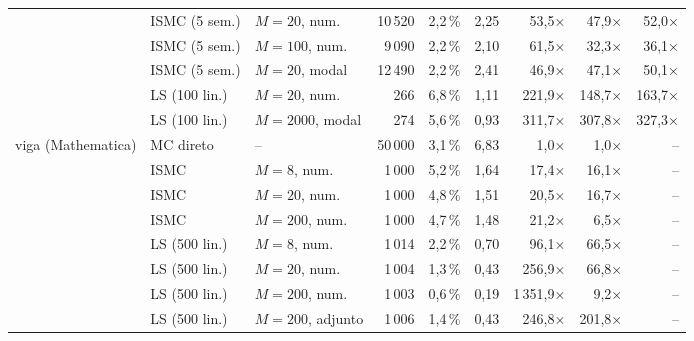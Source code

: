 \begin{landscape}
\begin{table}[H]
\begin{tabular}{lllrrrrrr}
 & ISMC (5 sem.) & $M = 20$, num. & 10\,520 & 2,2\,\% & 2,25 & 53,5× & 47,9× & 52,0× \\
 & ISMC (5 sem.) & $M = 100$, num. & 9\,090 & 2,2\,\% & 2,10 & 61,5× & 32,3× & 36,1× \\
 & ISMC (5 sem.) & $M = 20$, modal & 12\,490 & 2,2\,\% & 2,41 & 46,9× & 47,1× & 50,1× \\
 & LS (100 lin.) & $M = 20$, num. & 266 & 6,8\,\% & 1,11 & 221,9× & 148,7× & 163,7× \\
 & LS (100 lin.) & $M = 2000$, modal & 274 & 5,6\,\% & 0,93 & 311,7× & 307,8× & 327,3× \\
\midrule
viga (Mathematica) & MC direto & -- & 50\,000 & 3,1\,\% & 6,83 & 1,0× & 1,0× & -- \\
 & ISMC & $M = 8$, num. & 1\,000 & 5,2\,\% & 1,64 & 17,4× & 16,1× & -- \\
 & ISMC & $M = 20$, num. & 1\,000 & 4,8\,\% & 1,51 & 20,5× & 16,7× & -- \\
 & ISMC & $M = 200$, num. & 1\,000 & 4,7\,\% & 1,48 & 21,2× & 6,5× & -- \\
 & LS (500 lin.) & $M = 8$, num. & 1\,014 & 2,2\,\% & 0,70 & 96,1× & 66,5× & -- \\
 & LS (500 lin.) & $M = 20$, num. & 1\,004 & 1,3\,\% & 0,43 & 256,9× & 66,8× & -- \\
 & LS (500 lin.) & $M = 200$, num. & 1\,003 & 0,6\,\% & 0,19 & 1\,351,9× & 9,2× & -- \\
 & LS (500 lin.) & $M = 200$, adjunto & 1\,006 & 1,4\,\% & 0,43 & 246,8× & 201,8× & -- \\
\bottomrule\end{tabular}\end{table}
\end{landscape}
